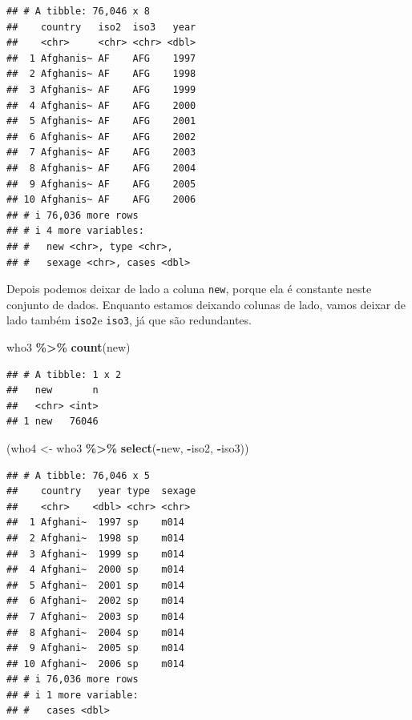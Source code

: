 \documentclass[
]{latex/krantz}
\newenvironment{Shaded}{\begin{snugshade}}{\end{snugshade}}
\newcommand{\FunctionTok}[1]{\textcolor[rgb]{0.13,0.29,0.53}{\textbf{#1}}}
\newcommand{\NormalTok}[1]{#1}
\newcommand{\OtherTok}[1]{\textcolor[rgb]{0.56,0.35,0.01}{#1}}
\newcommand{\SpecialCharTok}[1]{\textcolor[rgb]{0.81,0.36,0.00}{\textbf{#1}}}
\theoremstyle{definition}
\theoremstyle{definition}
\theoremstyle{definition}
\theoremstyle{definition}
\theoremstyle{remark}
\begin{document}
\begin{verbatim}
## # A tibble: 76,046 x 8
##    country   iso2  iso3   year
##    <chr>     <chr> <chr> <dbl>
##  1 Afghanis~ AF    AFG    1997
##  2 Afghanis~ AF    AFG    1998
##  3 Afghanis~ AF    AFG    1999
##  4 Afghanis~ AF    AFG    2000
##  5 Afghanis~ AF    AFG    2001
##  6 Afghanis~ AF    AFG    2002
##  7 Afghanis~ AF    AFG    2003
##  8 Afghanis~ AF    AFG    2004
##  9 Afghanis~ AF    AFG    2005
## 10 Afghanis~ AF    AFG    2006
## # i 76,036 more rows
## # i 4 more variables:
## #   new <chr>, type <chr>,
## #   sexage <chr>, cases <dbl>
\end{verbatim}

Depois podemos deixar de lado a coluna \texttt{new}, porque ela é constante neste conjunto de dados. Enquanto estamos deixando colunas de lado, vamos deixar de lado também \texttt{iso2}e \texttt{iso3}, já que são redundantes.

\begin{Shaded}
\begin{Highlighting}[]
\NormalTok{who3 }\SpecialCharTok{\%\textgreater{}\%} 
  \FunctionTok{count}\NormalTok{(new)}
\end{Highlighting}
\end{Shaded}

\begin{verbatim}
## # A tibble: 1 x 2
##   new       n
##   <chr> <int>
## 1 new   76046
\end{verbatim}

\begin{Shaded}
\begin{Highlighting}[]
\NormalTok{(who4 }\OtherTok{\textless{}{-}}\NormalTok{ who3 }\SpecialCharTok{\%\textgreater{}\%}
    \FunctionTok{select}\NormalTok{(}\SpecialCharTok{{-}}\NormalTok{new, }\SpecialCharTok{{-}}\NormalTok{iso2, }\SpecialCharTok{{-}}\NormalTok{iso3))}
\end{Highlighting}
\end{Shaded}

\begin{verbatim}
## # A tibble: 76,046 x 5
##    country   year type  sexage
##    <chr>    <dbl> <chr> <chr> 
##  1 Afghani~  1997 sp    m014  
##  2 Afghani~  1998 sp    m014  
##  3 Afghani~  1999 sp    m014  
##  4 Afghani~  2000 sp    m014  
##  5 Afghani~  2001 sp    m014  
##  6 Afghani~  2002 sp    m014  
##  7 Afghani~  2003 sp    m014  
##  8 Afghani~  2004 sp    m014  
##  9 Afghani~  2005 sp    m014  
## 10 Afghani~  2006 sp    m014  
## # i 76,036 more rows
## # i 1 more variable:
## #   cases <dbl>
\end{verbatim}
\end{document}
